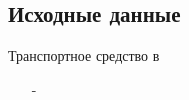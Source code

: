 \subsection{Исходные данные}
Транспортное средство  в 
\begin{enumerate}
	\item[-]	
%	
%	
\end{enumerate}
%

